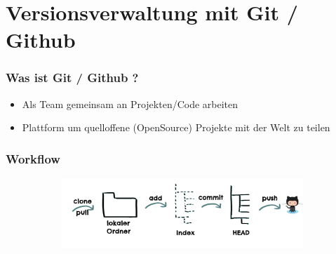 \documentclass{beamer}
\begin{document}
\section{Versionsverwaltung mit Git / Github}

\begin{frame}
\frametitle{Was ist Git / Github ?}

	\begin{itemize}
    \item Als Team gemeinsam an Projekten/Code arbeiten
    \item Plattform um quelloffene (OpenSource) Projekte mit der Welt zu teilen
    \end{itemize}


\end{frame}


\begin{frame}
\frametitle{Workflow}
\begin{figure}

\begin{figure}
\includegraphics[scale=0.3]{images/trees.png}
\end{figure}

\end{figure}

\end{frame}
\end{document}
